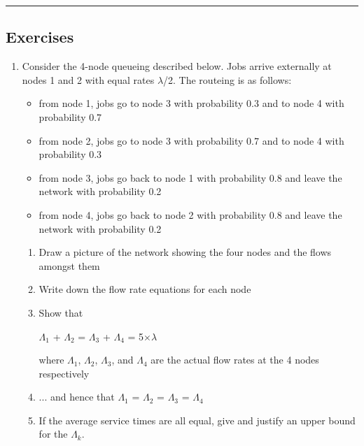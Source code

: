 \documentclass[12pt,fleqn]{report}
\begin{document}
\noindent
\hfill{\rule{160mm}{0.5mm}}

\subsection*{Exercises}

\begin{enumerate}

\item Consider the 4-node queueing described below.
Jobs arrive externally at nodes 1 and 2 with equal rates
$\lambda$/2. The routeing is as follows:

\begin{itemize}
\item from node 1, jobs go to node 3 with probability 0.3 
and to node 4 with probability 0.7

\item from node 2, jobs go to node 3 with probability 0.7 
and to node 4 with probability 0.3

\item from node 3, jobs go back to node 1 with probability 0.8 
and leave the network with probability 0.2 

\item from node 4, jobs go back to node 2 with probability 0.8 
and leave the network with probability 0.2 

\end{itemize}

\begin{enumerate}

\item Draw a picture of the network showing the four nodes
and the flows amongst them

\item Write down the flow rate equations for each node

\item Show that

\begin{center}
$\Lambda_1$ + $\Lambda_2$ =  $\Lambda_3$ + $\Lambda_4$ = 5$\times$$\lambda$
\end{center}

where $\Lambda_1$, $\Lambda_2$, $\Lambda_3$, and $\Lambda_4$ 
are the actual flow rates at the 4 nodes respectively


\item ... and hence that $\Lambda_1$ = $\Lambda_2$ =  $\Lambda_3$ = $\Lambda_4$


\item If the average service times are all equal, give 
and justify an upper bound for the $\Lambda_k$.

\end{enumerate}
\end{enumerate}
\end{document}
